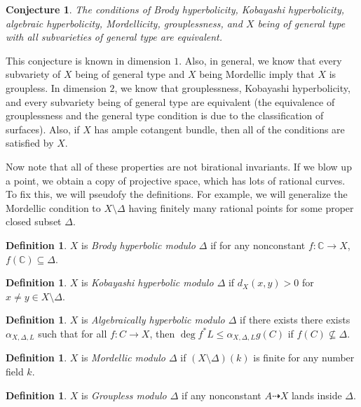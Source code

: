 \documentclass[leqno, openany]{memoir}
\newtheorem{conj}[thm]{Conjecture}
\theoremstyle{definition}
\newtheorem{defn}[thm]{Definition}
\theoremstyle{remark}
\theoremstyle{plain}
\theoremstyle{definition}
\theoremstyle{remark}
\newcommand{\C}{\mathbb{C}}
\begin{document}
\begin{conj}
    The conditions of Brody hyperbolicity, Kobayashi hyperbolicity, algebraic hyperbolicity, Mordellicity, grouplessness, and $X$ being of general type with all subvarieties of general type are equivalent.
\end{conj}

This conjecture is known in dimension $1$. Also, in general, we know that every subvariety of $X$ being of general type and $X$ being Mordellic imply that $X$ is groupless. In dimension $2$, we know that grouplessness, Kobayashi hyperbolicity, and every subvariety being of general type are equivalent (the equivalence of grouplessness and the general type condition is due to the classification of surfaces). Also, if $X$ has ample cotangent bundle, then all of the conditions are satisfied by $X$.

Now note that all of these properties are not birational invariants. If we blow up a point, we obtain a copy of projective space, which has lots of rational curves. To fix this, we will pseudofy the definitions. For example, we will generalize the Mordellic condition to $X \setminus \Delta$ having finitely many rational points for some proper closed subset $\Delta$.

\begin{defn}
    $X$ is \textit{Brody hyperbolic modulo $\Delta$} if for any nonconstant $f \colon \C \to X$, $f(\C) \subseteq \Delta$.
\end{defn}

\begin{defn}
    $X$ is \textit{Kobayashi hyperbolic modulo $\Delta$} if $d_X(x, y) > 0$ for $x \neq y \in X \setminus \Delta$.
\end{defn}

\begin{defn}
    $X$ is \textit{Algebraically hyperbolic modulo $\Delta$} if there exists there exists $\alpha_{X, \Delta, L}$ such that for all $f \colon C \to X$, then $\deg f^* L \leq \alpha_{X, \Delta, L} g(C)$ if $f(C) \not\subseteq \Delta$.
\end{defn}

\begin{defn}
    $X$ is \textit{Mordellic modulo $\Delta$} if $(X \setminus \Delta)(k)$ is finite for any number field $k$.
\end{defn}

\begin{defn}
    $X$ is \textit{Groupless modulo $\Delta$} if any nonconstant $A \dashrightarrow X$ lands inside $\Delta$.
\end{defn}
\end{document}
